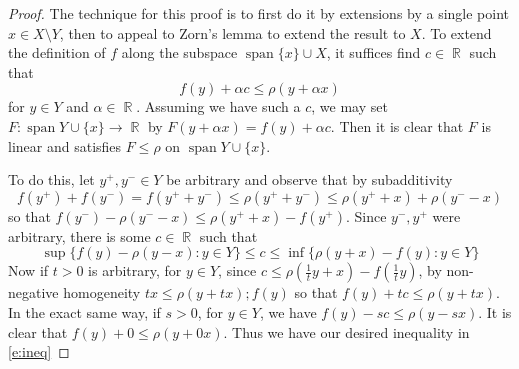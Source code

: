 \documentclass[11pt, a4paper]{memoir}
\DeclareMathOperator{\R}{{\mathbb{R}}}
\theoremstyle{change}
\theoremstyle{plain}
\theoremstyle{nonumberplain}
\newtheorem{proof}{Proof}
\DeclareMathOperator{\spn}{span}
\numberwithin{equation}{section}
\begin{document}
\begin{proof}
    The technique for this proof is to first do it by extensions by a single point $x\in X\setminus Y$, then to appeal to Zorn's lemma to extend the result to $X$.
    To extend the definition of $f$ along the subspace $\spn\{x\}\cup X$, it suffices find $c\in\R$ such that
    \begin{equation}\label{e:ineq}
        f(y)+\alpha c\leq\rho(y+\alpha x)
    \end{equation}
    for $y\in Y$ and $\alpha\in\R$.
    Assuming we have such a $c$, we may set $F:\spn Y\cup\{x\}\to\R$ by $F(y+\alpha x)=f(y)+\alpha c$.
    Then it is clear that $F$ is linear and satisfies $F\leq\rho$ on $\spn Y\cup\{x\}$.

    To do this, let $y^+,y^-\in Y$ be arbitrary and observe that by subadditivity
    \begin{equation*}
        f(y^+)+f(y^-)=f(y^++y^-)\leq \rho(y^++y^-)\leq\rho(y^++x)+\rho(y^--x)
    \end{equation*}
    so that $f(y^-)-\rho(y^--x)\leq\rho(y^++x)-f(y^+)$.
    Since $y^-,y^+$ were arbitrary, there is some $c\in\R$ such that
    \begin{equation*}
        \sup\{f(y)-\rho(y-x):y\in Y\}\leq c\leq\inf\{\rho(y+x)-f(y):y\in Y\}
    \end{equation*}
    Now if $t>0$ is arbitrary, for $y\in Y$, since $c\leq\rho\left(\frac{1}{t}y+x\right)-f\left(\frac{1}{t}y\right)$, by non-negative homogeneity $tx\leq\rho(y+tx);f(y)$ so that $f(y)+tc\leq\rho(y+tx)$.
    In the exact same way, if $s>0$, for $y\in Y$, we have $f(y)-sc\leq\rho(y-sx)$.
    It is clear that $f(y)+0\leq\rho(y+0x)$.
    Thus we have our desired inequality in \cref{e:ineq}


\end{proof}
\end{document}
